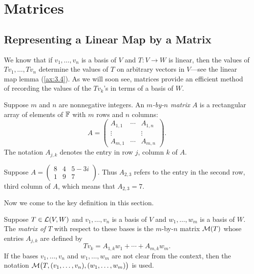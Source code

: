 \iftestbuild %
\setcounter{section}{2}\setcounter{theorem}{28}
\fi %
\section{Matrices}

\subsection{Representing a Linear Map by a Matrix}

We know that if $v_1,\dots,v_n$ is a basis of $V$ and $T\colon V\to W$ is
linear, then the values of $Tv_1,\dots,Tv_n$ determine the values of $T$ on
arbitrary vectors in $V$---see the linear map lemma (\ref{ax:3.4}). As we will
soon see, matrices provide an efficient method of recording the values of the
$Tv_k$'s in terms of a basis of $W$.

\begin{definition}[Matrix, $A_{j,k}$]\label{ax:3.29}
Suppose $m$ and $n$ are nonnegative integers. An \emph{$m$-by-$n$ matrix} $A$
is a rectangular array of elements of $\mathbb{F}$ with $m$ rows and $n$ columns:
\[ A = \begin{pmatrix} A_{1,1} & \cdots & A_{1,n}\\ \vdots & & \vdots\\
   A_{m,1} & \cdots & A_{m,n} \end{pmatrix}. \]
The notation $A_{j,k}$ denotes the entry in row $j$, column $k$ of $A$.
\end{definition}

%
\begin{example}\label{ax:3.30}
Suppose $A = \begin{pmatrix} 8 & 4 & 5-3i\\ 1 & 9 & 7 \end{pmatrix}$.
Thus $A_{2,3}$ refers to the entry in the second row, third column of $A$,
which means that $A_{2,3}=7$.
\end{example}

Now we come to the key definition in this section.

\begin{definition}\label{ax:3.31}
Suppose $T\in\mathcal{L}(V,W)$ and $v_1,\dots,v_n$ is a basis of $V$ and
$w_1,\dots,w_m$ is a basis of $W$. The \emph{matrix of $T$} with respect to
these bases is the $m$-by-$n$ matrix $\mathcal{M}(T)$ whose entries $A_{j,k}$ are
defined by
\[ Tv_k = A_{1,k}w_1+\cdots+A_{m,k}w_m. \]
If the bases $v_1,\dots,v_n$ and $w_1,\dots,w_m$ are not clear from the
context, then the notation $\mathcal{M}\bigl(T,(v_1,\dots,v_n),(w_1,\dots,w_m)\bigr)$
is used.
\end{definition}

